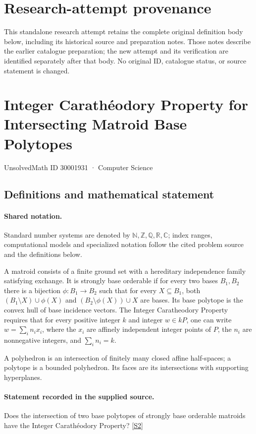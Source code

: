 \documentclass[11pt]{article}
\begin{document}
\section*{Research-attempt provenance}
This standalone research attempt retains the complete original definition body below,
including its historical source and preparation notes. Those notes describe the
earlier catalogue preparation; the new attempt and its verification are identified
separately after that body. No original ID, catalogue status, or source statement is changed.

\section{Integer Carathéodory Property for Intersecting Matroid Base Polytopes}\label{30001931}
{\small UnsolvedMath ID 30001931 · Computer Science}
\subsection{Definitions and mathematical statement}

\paragraph{Shared notation.}Standard number systems are denoted by $\mathbb N,\mathbb Z,\mathbb Q,\mathbb R,\mathbb C$; index ranges, computational models and specialized notation follow the cited problem source and the definitions below.


A matroid consists of a finite ground set with a hereditary independence family satisfying exchange. It is strongly base orderable if for every two bases $B_1,B_2$ there is a bijection $\phi:B_1\to B_2$ such that for every $X\subseteq B_1$, both $(B_1\setminus X)\cup\phi(X)$ and $(B_2\setminus\phi(X))\cup X$ are bases. Its base polytope is the convex hull of base incidence vectors. The Integer Caratheodory Property requires that for every positive integer $k$ and integer $w\in kP$, one can write $w=\sum_i n_ix_i$, where the $x_i$ are affinely independent integer points of $P$, the $n_i$ are nonnegative integers, and $\sum_i n_i=k$.

A polyhedron is an intersection of finitely many closed affine half-spaces; a polytope is a bounded polyhedron. Its faces are its intersections with supporting hyperplanes.
\paragraph{Statement recorded in the supplied source.}
Does the intersection of two base polytopes of strongly base orderable matroids have the Integer Carathéodory Property? \href{https://doi.org/10.4171/owr/2011/53}{[S2]}
\end{document}
